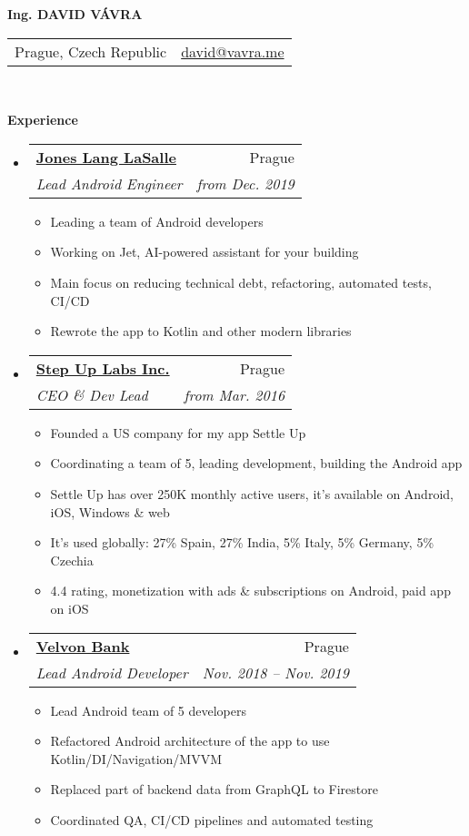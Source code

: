 \documentclass[letterpaper,11pt]{article}
\makeatletter
\newcommand{\resitem}[1]{\item #1 \vspace{-2pt}}
\newcommand{\resheading}[1]{{\large \colorbox{mygrey}{\begin{minipage}{\textwidth}{\textbf{#1 \vphantom{p\^{E}}}}\end{minipage}}}}
\newcommand{\ressubheading}[4]{
\begin{tabular*}{6.5in}{l@{\extracolsep{\fill}}r}
		\textbf{#1} & #2 \\
		\textit{#3} & \textit{#4} \\
\end{tabular*}\vspace{-6pt}}
\makeatother
\begin{document}
\newcommand{\myheader}{
\begin{center}
\textbf{\Huge Ing. DAVID VÁVRA}
\end{center} 
\begin{tabular*}{7in}{l@{\extracolsep{\fill}}r}
	Prague, Czech Republic &  \href{mailto:david@vavra.me}{david@vavra.me} \\
	\end{tabular*}
\\
\vspace{0.1in}}

\myheader



\resheading{Experience}
	\begin{itemize}
	\item 
			\ressubheading{\href{https://www.us.jll.com/}{Jones Lang LaSalle}}{Prague}{Lead Android Engineer}{from Dec. 2019}
				{ \footnotesize
				\begin{itemize}
					\resitem{Leading a team of Android developers}
					\resitem{Working on Jet, AI-powered assistant for your building}
					\resitem{Main focus on reducing technical debt, refactoring, automated tests, CI/CD}
					\resitem{Rewrote the app to Kotlin and other modern libraries}
				\end{itemize}
				}	
	\item 
			\ressubheading{\href{https://stepuplabs.io}{Step Up Labs Inc.}}{Prague}{CEO \& Dev Lead}{from Mar. 2016}
				{ \footnotesize
				\begin{itemize}
					\resitem{Founded a US company for my app Settle Up}
					\resitem{Coordinating a team of 5, leading development, building the Android app}
					\resitem{Settle Up has over 250K monthly active users, it's available on Android, iOS, Windows \& web}
					\resitem{It's used globally: 27\% Spain, 27\% India, 5\% Italy, 5\% Germany, 5\% Czechia}
					\resitem{4.4 rating, monetization with ads \& subscriptions on Android, paid app on iOS}
					
				\end{itemize}
				}	
	\item 
			\ressubheading{\href{https://airbank.net}{Velvon Bank}}{Prague}{Lead Android Developer}{Nov. 2018 -- Nov. 2019}
				{ \footnotesize
				\begin{itemize}
					\resitem{Lead Android team of 5 developers }
					\resitem{Refactored Android architecture of the app to use Kotlin/DI/Navigation/MVVM }
					\resitem{Replaced part of backend data from GraphQL to Firestore}
					\resitem{Coordinated QA, CI/CD pipelines and automated testing}
					

\end{itemize}}
\end{itemize}
\end{document}
